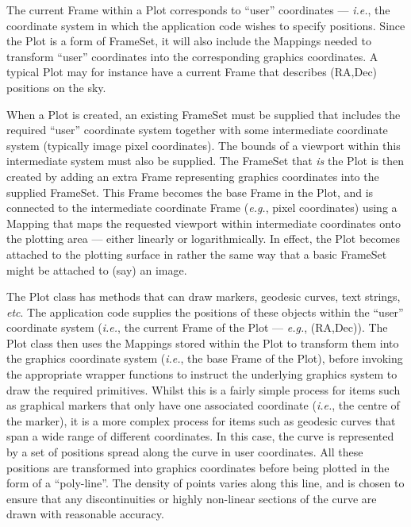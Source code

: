 \documentclass[final,authoryear,5p,times,twocolumn]{elsarticle}
\begin{document}
The current Frame within a Plot corresponds to ``user''  coordinates ---
\emph{i.e.}, the coordinate system in which the application code wishes to
specify positions. Since the Plot is a form of FrameSet, it will also
include the Mappings needed to transform ``user'' coordinates into the
corresponding graphics coordinates. A typical Plot may for instance
have a current Frame that describes (RA,Dec) positions on the sky.

When a Plot is created, an existing FrameSet must be supplied that
includes the required ``user'' coordinate system together with some
intermediate coordinate system (typically image pixel coordinates). The
bounds of a viewport within this intermediate system must also be
supplied. The FrameSet that \emph{is} the Plot is then created by adding
an extra Frame representing graphics coordinates into the supplied
FrameSet. This Frame becomes the base Frame in the Plot, and is connected
to the intermediate coordinate Frame (\emph{e.g.}, pixel coordinates)
using a Mapping that maps the requested viewport within intermediate
coordinates onto the plotting area --- either linearly or
logarithmically. In effect, the Plot becomes attached to the plotting
surface in rather the same way that a basic FrameSet might be attached
to (say) an image.

The Plot class has methods that can draw markers, geodesic curves, text
strings, \emph{etc}. The application code supplies the positions of these
objects within the ``user'' coordinate system (\emph{i.e.}, the current
Frame of the Plot --- \emph{e.g.}, (RA,Dec)). The Plot class then uses the
Mappings stored within the Plot to transform them into the graphics
coordinate system (\emph{i.e.}, the base Frame of the Plot), before
invoking the appropriate wrapper functions to instruct the underlying
graphics system to draw the required primitives. Whilst this is a fairly
simple process for items such as graphical markers that only have one
associated coordinate (\emph{i.e.}, the centre of the marker), it is a
more complex process for items such as geodesic curves that span a wide
range of different coordinates. In this case, the curve is represented by
a set of positions spread along the curve in user coordinates. All these
positions are transformed into graphics coordinates before being plotted
in the form of a ``poly-line''. The density of points varies along this
line, and is chosen to ensure that any discontinuities or highly
non-linear sections of the curve are drawn with reasonable accuracy.
\end{document}
